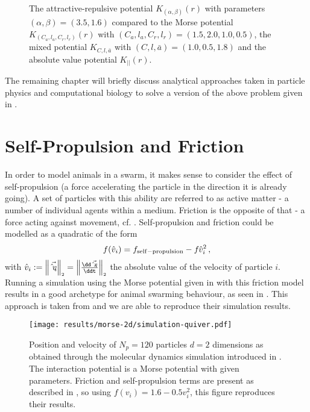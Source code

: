 \begin{figure}[H]
  \centering
  \caption[Comparing potentials]{The attractive-repulsive potential $K_{(\alpha,\beta)}(r)$ with parameters $(\alpha,\beta) = (3.5, 1.6)$ compared to the Morse potential $K_{(C_a, l_a, C_r, l_r)}(r)$ with $(C_a, l_a, C_r, l_r) = (1.5, 2.0, 1.0, 0.5)$, the mixed potential $K_{C, l, \bar{a}}$ with $(C, l, \bar{a}) = (1.0, 0.5, 1.8)$ and the absolute value potential $K_{||}(r)$.}
  \label{fig:comparing-potentials}
\end{figure}

The remaining chapter will briefly discuss analytical approaches taken in particle physics and computational biology to solve a version of the above problem given in .

\section{Self-Propulsion and Friction}
\label{sec:self-propulsion-friction}
In order to model animals in a swarm, it makes sense to consider the effect of self-propulsion (a force accelerating the particle in the direction it is already going).
A set of particles with this ability are referred to as active matter - a number of individual agents within a medium.
Friction is the opposite of that - a force acting against movement, cf. .
Self-propulsion and friction could be modelled as a quadratic of the form
$$f(\hat{v}_i) = f_{\rm self-propulsion} - f_{\rm } \hat{v}_i^2\,,$$
with $\hat{v}_i := \norm{\vec{\hat{v}_i}} = \norm{\frac{\dd\vec{\hat{x}_i}}{\ddt}}$ the absolute value of the velocity of particle $i$.
Running a simulation using the Morse potential given in  with this friction model results in a good archetype for animal swarming behaviour, as seen in .
This approach is taken from \cite{2006-self-propelled} and we are able to reproduce their simulation results.

\begin{figure}[H]
  \centering
  \texttt{[image: results/morse-2d/simulation-quiver.pdf]}
  \caption[Quiver plot of 120 particles in 2D interacting through the Morse potential]{Position and velocity of $N_p = 120$ particles $d = 2$ dimensions as obtained through the molecular dynamics simulation introduced in . The interaction potential is a Morse potential with given parameters. Friction and self-propulsion terms are present as described in \cite{2006-self-propelled}, so using $f(v_i) = 1.6 - 0.5 v_i^2$, this figure reproduces their results.}
  \label{fig:simulation-quiver-illustration}
\end{figure}

